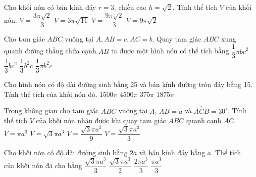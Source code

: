 \begin{ex}
	Cho khối nón có bán kính đáy $r=3$, chiều cao $h=\sqrt{2}$. Tính thể tích $V$ của khối nón. 
	\choice
	{$V=\dfrac{3\pi\sqrt{2}}{3}$}
	{$V=3\pi\sqrt{11}$}
	{\True $V=\dfrac{9\pi\sqrt{2}}{3}$}
	{$V=9\pi\sqrt{2}$}
\end{ex}
\begin{ex}
	Cho tam giác $ABC$ vuông tại $A,AB=c,AC=b$. Quay tam giác $ABC$ xung quanh đường thẳng chứa cạnh $AB$ ta được một hình nón có thể tích bằng
	\choice
	{$\dfrac{1}{3}\pi bc^2$}
	{$\dfrac{1}{3}bc^2$}
	{$\dfrac{1}{3}b^2c$}
	{\True $\dfrac{1}{3}\pi b^2c$}
\end{ex}
\begin{ex}
	Cho hình nón có độ dài đường sinh bằng 25 và bán kính đường tròn đáy bằng 15. Tính thể tích của khối nón đó. 
	\choice
	{\True $1500\pi$}
	{$4500\pi$}
	{$375\pi$}
	{$1875\pi$}
\end{ex}
\begin{ex}
	[Mã 105 2017]%
	Trong không gian cho tam giác $ABC$ vuông tại $A$, $AB=a$ và $\widehat{ACB}=30^{\circ}$. Tính thể tích $V$ của khối nón nhận được khi quay tam giác $ABC$ quanh cạnh $AC$. 
	\choice
	{$V=\pi a^3$}
	{$V=\sqrt{3}\pi a^3$}
	{$V=\dfrac{\sqrt{3}\pi a^3}{9}$}
	{\True $V=\dfrac{\sqrt{3}\pi a^3}{3}$}
\end{ex}
\begin{ex}
	Cho khối nón có độ dài đường sinh bằng $2a$ và bán kính đáy bằng $a$. Thể tích của khối nón đã cho bằng
	\choice
	{\True $\dfrac{\sqrt{3}\pi a^3}{3}$}
	{$\dfrac{\sqrt{3}\pi a^3}{2}$}
	{$\dfrac{2\pi a^3}{3}$}
	{$\dfrac{\pi a^3}{3}$}
\end{ex}
